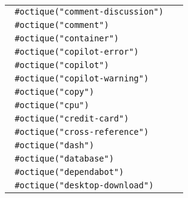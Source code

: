 \begin{longtable}[]{@{}lc@{}}
\texttt{\ \#octique("comment-discussion")\ } &
\pandocbounded{} \\
\texttt{\ \#octique("comment")\ } &
\pandocbounded{} \\
\texttt{\ \#octique("container")\ } &
\pandocbounded{} \\
\texttt{\ \#octique("copilot-error")\ } &
\pandocbounded{} \\
\texttt{\ \#octique("copilot")\ } &
\pandocbounded{} \\
\texttt{\ \#octique("copilot-warning")\ } &
\pandocbounded{} \\
\texttt{\ \#octique("copy")\ } &
\pandocbounded{} \\
\texttt{\ \#octique("cpu")\ } &
\pandocbounded{} \\
\texttt{\ \#octique("credit-card")\ } &
\pandocbounded{} \\
\texttt{\ \#octique("cross-reference")\ } &
\pandocbounded{} \\
\texttt{\ \#octique("dash")\ } &
\pandocbounded{} \\
\texttt{\ \#octique("database")\ } &
\pandocbounded{} \\
\texttt{\ \#octique("dependabot")\ } &
\pandocbounded{} \\
\texttt{\ \#octique("desktop-download")\ } &
\pandocbounded{} \\

\end{longtable}
